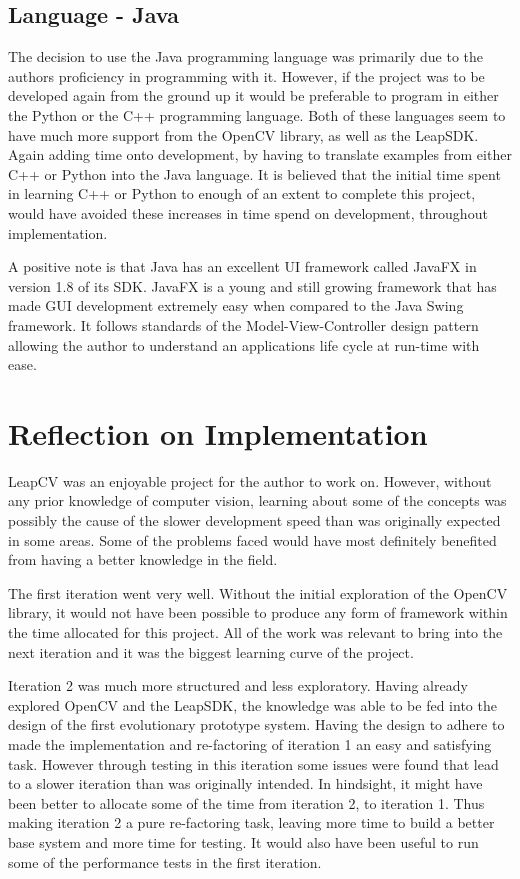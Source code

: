 \documentclass[11pt,oneside]{report}
\begin{document}
		\subsection{Language - Java}
			The decision to use the Java programming language was primarily due to the authors proficiency in programming with it.
			However, if the project was to be developed again from the ground up it would be preferable to program in either the Python or the C++ programming language.
			Both of these languages seem to have much more support from the OpenCV library, as well as the LeapSDK.
			Again adding time onto development, by having to translate examples from either C++ or Python into the Java language.
			It is believed that the initial time spent in learning C++ or Python to enough of an extent to complete this project, would have avoided these increases in time spend on development, throughout implementation.
			
			A positive note is that Java has an excellent UI framework called JavaFX in version 1.8 of its SDK.
			JavaFX is a young and still growing framework that has made GUI development extremely easy when compared to the Java Swing framework.
			It follows standards of the Model-View-Controller design pattern allowing the author to understand an applications life cycle at run-time with ease.
	\section{Reflection on Implementation}
		LeapCV was an enjoyable project for the author to work on.
		However, without any prior knowledge of computer vision, learning about some of the concepts was possibly the cause of the slower development speed than was originally expected in some areas.
		Some of the problems faced would have most definitely benefited from having a better knowledge in the field.
		
		The first iteration went very well.
		Without the initial exploration of the OpenCV library, it would not have been possible to produce any form of framework within the time allocated for this project.
		All of the work was relevant to bring into the next iteration and it was the biggest learning curve of the project.
		
		Iteration 2 was much more structured and less exploratory.
		Having already explored OpenCV and the LeapSDK, the knowledge was able to be fed into the design of the first evolutionary prototype system.
		Having the design to adhere to made the implementation and re-factoring of iteration 1 an easy and satisfying task.
		However through testing in this iteration some issues were found that lead to a slower iteration than was originally intended.
		In hindsight, it might have been better to allocate some of the time from iteration 2, to iteration 1.
		Thus making iteration 2 a pure re-factoring task, leaving more time to build a better base system and more time for testing.
		It would also have been useful to run some of the performance tests in the first iteration.
		
\end{document}
